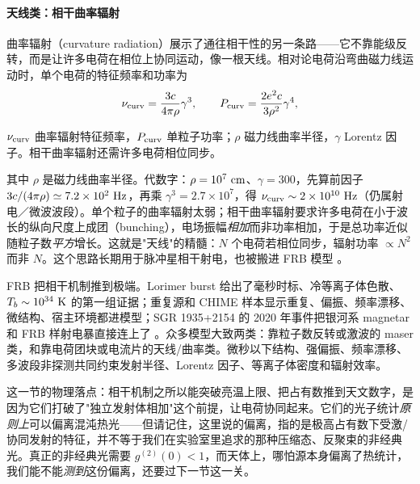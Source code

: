 \paragraph{天线类：相干曲率辐射}
\label{sec:e16-curvature}

曲率辐射（curvature radiation）展示了通往相干性的另一条路——它不靠能级反转，而是让许多电荷在相位上协同运动，像一根天线。相对论电荷沿弯曲磁力线运动时，单个电荷的特征频率和功率为
\begin{equation}
  \nu_{\rm curv}=\frac{3c}{4\pi\rho}\gamma^3,
  \qquad
  P_{\rm curv}=\frac{2e^2c}{3\rho^2}\gamma^4 ,
  \label{eq:e16-curvature}
\end{equation}
\begin{formulaexplain}
\(\nu_{\rm curv}\) 曲率辐射特征频率，\(P_{\rm curv}\) 单粒子功率；\(\rho\) 磁力线曲率半径，\(\gamma\) Lorentz 因子。相干曲率辐射还需许多电荷相位同步。
\end{formulaexplain}
其中 \(\rho\) 是磁力线曲率半径。代数字：\(\rho=10^7~{\rm cm}\)、\(\gamma=300\)，先算前因子 \(3c/(4\pi\rho)\simeq7.2\times10^2~{\rm Hz}\)，再乘 \(\gamma^3=2.7\times10^7\)，得 \(\nu_{\rm curv}\sim2\times10^{10}~{\rm Hz}\)（仍属射电／微波波段）。单个粒子的曲率辐射太弱；相干曲率辐射要求许多电荷在小于波长的纵向尺度上成团（bunching），电场振幅\emph{相加}而非功率相加，于是总功率近似随粒子数\emph{平方}增长。这就是"天线"的精髓：\(N\) 个电荷若相位同步，辐射功率 \(\propto N^2\) 而非 \(N\)。这个思路长期用于脉冲星相干射电，也被搬进 FRB 模型 \citep{1977ApJ...212..800C,2018MNRAS.477.2470L}。

FRB 把相干机制推到极端。Lorimer burst 给出了毫秒时标、冷等离子体色散、\(T_b\sim10^{34}~{\rm K}\) 的第一组证据；重复源和 CHIME 样本显示重复、偏振、频率漂移、微结构、宿主环境都进模型；SGR 1935+2154 的 2020 年事件把银河系 magnetar 和 FRB 样射电暴直接连上了 \citep{2007Sci...318..777L,2019A&ARv..27....4P,2022A&ARv..30....2P,2020Natur.587...54C,2020Natur.587...59B}。众多模型大致两类：靠粒子数反转或激波的 maser 类，和靠电荷团块或电流片的天线/曲率类。微秒以下结构、强偏振、频率漂移、多波段非探测共同约束发射半径、Lorentz 因子、等离子体密度和辐射效率。

这一节的物理落点：相干机制之所以能突破亮温上限、把占有数推到天文数字，是因为它们打破了"独立发射体相加"这个前提，让电荷协同起来。它们的光子统计\emph{原则上}可以偏离混沌热光——但请记住，这里说的偏离，指的是极高占有数下受激/协同发射的特征，并不等于我们在实验室里追求的那种压缩态、反聚束的非经典光。真正的非经典光需要 \(g^{(2)}(0)<1\)，而天体上，哪怕源本身偏离了热统计，我们能不能\emph{测到}这份偏离，还要过下一节这一关。

